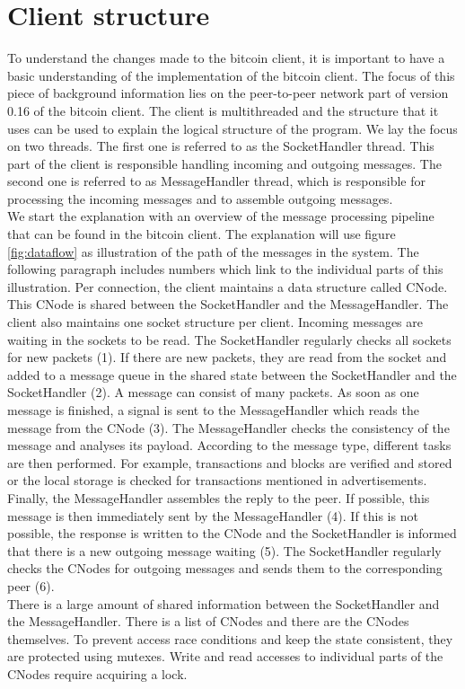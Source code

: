 \section{Client structure}
To understand the changes made to the bitcoin client, it is important to have a basic understanding of the implementation of the bitcoin client. The focus of this piece of background information lies on the peer-to-peer network part of version 0.16 of the bitcoin client. The client is multithreaded and the structure that it uses can be used to explain the logical structure of the program. We lay the focus on two threads. The first one is referred to as the SocketHandler thread. This part of the client is responsible handling incoming and outgoing messages. The second one is referred to as MessageHandler thread, which is responsible for processing the incoming messages and to assemble outgoing messages.\\
We start the explanation with an overview of the message processing pipeline that can be found in the bitcoin client. The explanation will use figure \ref{fig:dataflow} as illustration of the path of the messages in the system. The following paragraph includes numbers which link to the individual parts of this illustration. Per connection, the client maintains a data structure called CNode. This CNode is shared between the SocketHandler and the MessageHandler. The client also maintains one socket structure per client. Incoming messages are waiting in the sockets to be read. The SocketHandler regularly checks all sockets for new packets (1). If there are new packets, they are read from the socket and added to a message queue in the shared state between the SocketHandler and the SocketHandler (2). A message can consist of many packets. As soon as one message is finished, a signal is sent to the MessageHandler which reads the message from the CNode (3). The MessageHandler checks the consistency of the message and analyses its payload. According to the message type, different tasks are then performed. For example, transactions and blocks are verified and stored or the local storage is checked for transactions mentioned in advertisements. Finally, the MessageHandler assembles the reply to the peer. If possible, this message is then immediately sent by the MessageHandler (4). If this is not possible, the response is written to the CNode and the SocketHandler is informed that there is a new outgoing message waiting (5). The SocketHandler regularly checks the CNodes for outgoing messages and sends them to the corresponding peer (6).\\
There is a large amount of shared information between the SocketHandler and the MessageHandler. There is a list of CNodes and there are the CNodes themselves. To prevent access race conditions and keep the state consistent, they are protected using mutexes. Write and read accesses to individual parts of the CNodes require acquiring a lock.

